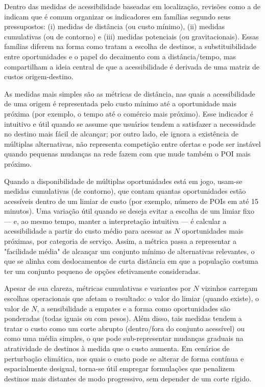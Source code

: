 Dentro das medidas de acessibilidade baseadas em localização, revisões como a de \cite{Geurs2004} indicam que é comum organizar os indicadores em famílias segundo seus pressupostos: (i) medidas de distância (ou custo mínimo), (ii) medidas cumulativas (ou de contorno) e (iii) medidas potenciais (ou gravitacionais). Essas famílias diferem na forma como tratam a escolha de destinos, a substituibilidade entre oportunidades e o papel do decaimento com a distância/tempo, mas compartilham a ideia central de que a acessibilidade é derivada de uma matriz de custos origem-destino.

As medidas mais simples são as métricas de distância, nas quais a acessibilidade de uma origem é representada pelo custo mínimo até a oportunidade mais próxima (por exemplo, o tempo até o comércio mais próximo). Esse indicador é intuitivo e útil quando se assume que usuários tendem a satisfazer a necessidade no destino mais fácil de alcançar; por outro lado, ele ignora a existência de múltiplas alternativas, não representa competição entre ofertas e pode ser instável quando pequenas mudanças na rede fazem com que mude também o POI mais próximo.

Quando a disponibilidade de múltiplas oportunidades está em jogo, usam-se medidas cumulativas (de contorno), que contam quantas oportunidades estão acessíveis dentro de um limiar de custo (por exemplo, número de POIs em até 15 minutos). Uma variação útil quando se deseja evitar a escolha de um limiar fixo --- e, ao mesmo tempo, manter a interpretação intuitiva --- é calcular a acessibilidade a partir do custo médio para acessar as $N$ oportunidades mais próximas, por categoria de serviço. Assim, a métrica passa a representar a "facilidade média" de alcançar um conjunto mínimo de alternativas relevantes, o que se alinha com deslocamentos de curta distância em que a população costuma ter um conjunto pequeno de opções efetivamente consideradas.

Apesar de sua clareza, métricas cumulativas e variantes por $N$ vizinhos carregam escolhas operacionais que afetam o resultado: o valor do limiar (quando existe), o valor de $N$, a sensibilidade a empates e a forma como oportunidades são ponderadas (todas iguais ou com pesos). Além disso, tais medidas tendem a tratar o custo como um corte abrupto (dentro/fora do conjunto acessível) ou como uma média simples, o que pode sub-representar mudanças graduais na atratividade de destinos à medida que o custo aumenta. Em cenários de perturbação climática, nos quais o custo pode se alterar de forma contínua e espacialmente desigual, torna-se útil empregar formulações que penalizem destinos mais distantes de modo progressivo, sem depender de um corte rígido.

